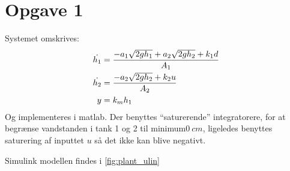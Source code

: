 \section{Opgave 1}
Systemet omskrives:
\begin{align*}
\dot{h_1} &= \frac{-a_1\sqrt{2gh_1} + a_2\sqrt{2gh_2} + k_1d}{A_1}\\
\dot{h_2} &= \frac{-a_2\sqrt{2gh_2} + k_2u}{A_2}\\
y &= k_mh_1\\
\end{align*}
Og implementeres i matlab. Der benyttes ``saturerende'' integratorere, for at
begrænse vandstanden i tank 1 og 2 til minimum$0~cm$, ligeledes benyttes saturering af
inputtet $u$ så det ikke kan blive negativt.

Simulink modellen findes i \ref{fig:plant_ulin}

